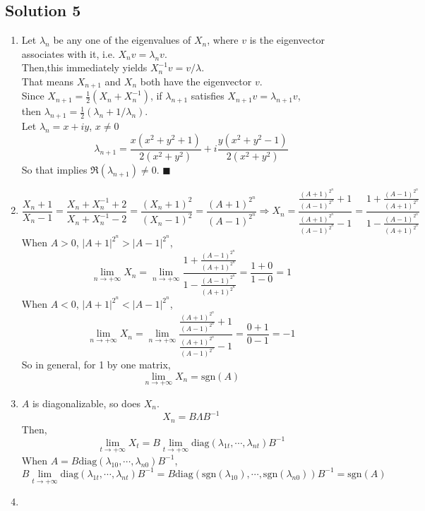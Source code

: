 \documentclass{article}
\begin{document}
\subsection*{Solution 5}
\begin{enumerate}
    \item Let $\lambda_n$ be any one of the eigenvalues of $X_n$, where $v$ is the eigenvector associates with it, i.e. $X_nv = \lambda_n v$. \\
    Then,this immediately yields $X_n^{-1}v = v/\lambda$.\\
    That means $X_{n+1}$ and $X_n$ both have the eigenvector $v$. \\
    Since $X_{n+1} = \frac{1}{2} (X_n+X_n^{-1})$, if $\lambda_{n+1}$ satisfies $X_{n+1}v=\lambda_{n+1}v$, \\
    then $\lambda_{n + 1} = \frac{1}{2}(\lambda_n + 1/\lambda_n)$. \\
    Let $\lambda_n = x + iy$, $x\neq 0$
    \[\lambda_{n + 1} = 
    \frac{x(x ^ 2 + y ^ 2 + 1)}{2(x ^ 2 + y ^ 2)} 
    + i\frac{y(x ^ 2 + y ^ 2 - 1)}{2(x ^ 2 + y ^ 2)}\]
    So that implies $\Re(\lambda_{n + 1}) \neq 0$. $\blacksquare$
    \item
    \[\frac{X_n + 1}{X_n - 1} 
    = \frac{X_n + X_n^{-1} + 2}{X_n + X_n^{-1} - 2} 
    = \frac{(X_n + 1) ^ 2}{(X_n - 1) ^ 2}
    = \frac{(A + 1) ^ {2 ^ n}}{(A - 1) ^ {2 ^ n}}
    \Rightarrow
    X_n = \frac{\frac{(A + 1) ^ {2 ^ n}}{(A - 1) ^ {2 ^ n}} + 1}
    {\frac{(A + 1) ^ {2 ^ n}}{(A - 1) ^ {2 ^ n}} - 1} 
    = \frac{1 + \frac{(A - 1) ^ {2 ^ n}}{(A + 1) ^ {2 ^ n}}}
    {1 - \frac{(A - 1) ^ {2 ^ n}}{(A + 1) ^ {2 ^ n}}}
    \]
    When $A > 0$, $|A + 1| ^ {2 ^ n} > |A - 1| ^ {2 ^ n}$,
    \[\lim_{n\to +\infty} X_n = \lim_{n\to+\infty}\frac{1 + \frac{(A - 1) ^ {2 ^ n}}{(A + 1) ^ {2 ^ n}}}
    {1 - \frac{(A - 1) ^ {2 ^ n}}{(A + 1) ^ {2 ^ n}}} = \frac{1 + 0}{1 - 0} = 1\]
    When $A < 0$, $|A + 1| ^ {2 ^ n} < |A - 1| ^ {2 ^ n}$,
    \[\lim_{n\to +\infty} X_n = \lim_{n\to+\infty} \frac{\frac{(A + 1) ^ {2 ^ n}}{(A - 1) ^ {2 ^ n}} + 1}
    {\frac{(A + 1) ^ {2 ^ n}}{(A - 1) ^ {2 ^ n}} - 1} = \frac{0 + 1}{0 - 1} = -1\]
    So in general, for 1 by one matrix,
    \[\lim_{n\to +\infty} X_n = \mathrm{sgn}(A)\]
    \item 
    $A$ is diagonalizable, so does $X_n$. 
    \[X_n = B \Lambda B^{-1}\]
    Then,
    \[\lim_{t\to+\infty}X_t = B \lim_{t\to+\infty} \mathrm{diag}(\lambda_{1t},\cdots,\lambda_{nt})B^{-1}\]
    When $A = B\mathrm{diag}(\lambda_{10},\cdots,\lambda_{n0})B^{-1} $, 
    \[ B \lim_{t\to+\infty} \mathrm{diag}(\lambda_{1t},\cdots,\lambda_{nt})B^{-1} 
    = B \mathrm{diag}(\mathrm{sgn}(\lambda_{10}), \cdots, \mathrm{sgn}(\lambda_{n0})) B^{-1} = \mathrm{sgn}(A)\]
    \item
\end{enumerate}
\end{document}
